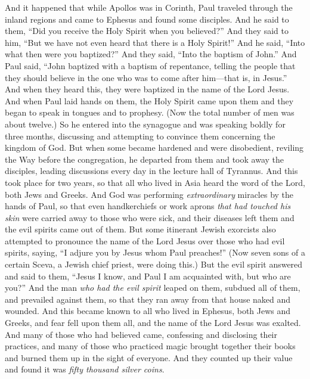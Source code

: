 \begin{biblechapter} %
 And it happened that while Apollos was in Corinth, Paul traveled through the inland regions and came to Ephesus and found some disciples.
\verse And he said to them, “Did you receive the Holy Spirit when you believed?” And they said to him, “But we have not even heard that there is a Holy Spirit!”
\verse And he said, “Into what then were you baptized?” And they said, “Into the baptism of John.”
\verse And Paul said, “John baptized with a baptism of repentance, telling the people that they should believe in the one who was to come after him—that is, in Jesus.”
\verse And when they heard this, they were baptized in the name of the Lord Jesus.
\verse And when Paul laid hands on them, the Holy Spirit came upon them and they began to speak in tongues and to prophesy.
\verse (Now the total number of men was about twelve.)
\verse So he entered into the synagogue and was speaking boldly for three months, discussing and attempting to convince them concerning the kingdom of God.
\verse But when some became hardened and were disobedient, reviling the Way before the congregation, he departed from them and took away the disciples, leading discussions every day in the lecture hall of Tyrannus.
\verse And this took place for two years, so that all who lived in Asia heard the word of the Lord, both Jews and Greeks.
 And God was performing \textit{extraordinary} miracles by the hands of Paul,
\verse so that even handkerchiefs or work aprons \textit{that had touched his skin} were carried away to those who were sick, and their diseases left them and the evil spirits came out of them.
\verse But some itinerant Jewish exorcists also attempted to pronounce the name of the Lord Jesus over those who had evil spirits, saying, “I adjure you by Jesus whom Paul preaches!”
\verse (Now seven sons of a certain Sceva, a Jewish chief priest, were doing this.)
\verse But the evil spirit answered and said to them, “Jesus I know, and Paul I am acquainted with, but who are you?”
\verse And the man \textit{who had the evil spirit} leaped on them, subdued all of them, and prevailed against them, so that they ran away from that house naked and wounded.
\verse And this became known to all who lived in Ephesus, both Jews and Greeks, and fear fell upon them all, and the name of the Lord Jesus was exalted.
\verse And many of those who had believed came, confessing and disclosing their practices,
\verse and many of those who practiced magic brought together their books and burned them up in the sight of everyone. And they counted up their value and found it was \textit{fifty thousand silver coins}.

\end{biblechapter}
